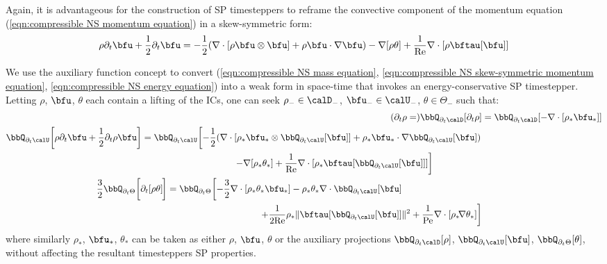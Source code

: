     Again, it is advantageous for the construction of SP timesteppers to reframe the convective component of the momentum equation (\ref{eqn:compressible NS momentum equation}) in a skew-symmetric form:
    \begin{equation}
        \rho\partial_{t}\bfu + \frac{1}{2}\partial_{t}\bfu
        =
        - \frac{1}{2}(\nabla\cdot\left[\rho\bfu\otimes\bfu\right] + \rho\bfu\cdot\nabla\bfu) - \nabla[\rho\theta] + \frac{1}{\rmRe}\nabla\cdot[\rho\bftau[\bfu]]  \label{eqn:compressible NS skew-symmetric momentum equation}
    \end{equation}

    We use the auxiliary function concept to convert (\ref{eqn:compressible NS mass equation}, \ref{eqn:compressible NS skew-symmetric momentum equation}, \ref{eqn:compressible NS energy equation}) into a weak form in space-time that invokes an energy-conservative SP timestepper. Letting $\rho$, $\bfu$, $\theta$ each contain a lifting of the ICs, one can seek $\rho_{-} \in \calD_{-}$, $\bfu_{-} \in \calU_{-}$, $\theta \in \Theta_{-}$ such that:
    \begin{align}
            (\partial_{t}\rho
            =)  \bbQ_{\partial_{t}\calD}[\partial_{t}\rho]
            &=
            \bbQ_{\partial_{t}\calD}[- \nabla\cdot[\rho_{*}\bfu_{*}]]  \label{eqn:compressible NS weak mass equation}  \\
        \begin{split}
            \bbQ_{\partial_{t}\calU}\!\left[\rho\partial_{t}\bfu
            + \frac{1}{2}\partial_{t}\rho\bfu\right]
            &=
            \bbQ_{\partial_{t}\calU}\!\left[- \frac{1}{2}(\nabla\cdot\left[\rho_{*}\bfu_{*}\otimes\bbQ_{\partial_{t}\calU}[\bfu]\right] + \rho_{*}\bfu_{*}\cdot\nabla\bbQ_{\partial_{t}\calU}[\bfu])\right.  \\
            &\qquad\qquad\qquad\qquad\qquad\left.- \nabla[\rho_{*}\theta_{*}]
            + \frac{1}{\rmRe}\nabla\cdot[\rho_{*}\bftau[\bbQ_{\partial_{t}\calU}[\bfu]]]\right]
        \end{split}  \\
        \begin{split}
            \frac{3}{2}\bbQ_{\partial_{t}\Theta}\!\left[\partial_{t}[\rho\theta]\tall\!\right]
            &=
            \bbQ_{\partial_{t}\Theta}\!\left[- \frac{3}{2}\nabla\cdot\left[\rho_{*}\theta_{*}\bfu_{*}\right]
            - \rho_{*}\theta_{*}\nabla\cdot\bbQ_{\partial_{t}\calU}[\bfu]\right.  \\
            &\qquad\qquad\qquad\qquad\qquad\left.+ \frac{1}{2\rmRe}\rho_{*}\|\bftau[\bbQ_{\partial_{t}\calU}[\bfu]]\|^{2}
            + \frac{1}{\rmPe}\nabla\cdot[\rho_{*}\!\nabla\theta_{*}]\right]
      \end{split}  \label{eqn:compressible NS weak energy equation}
    \end{align}
    where similarly $\rho_{*}$, $\bfu_{*}$, $\theta_{*}$ can be taken as either $\rho$, $\bfu$, $\theta$ or the auxiliary projections $\bbQ_{\partial_{t}\calD}[\rho]$, $\bbQ_{\partial_{t}\calU}[\bfu]$, $\bbQ_{\partial_{t}\Theta}[\theta]$, without affecting the resultant timesteppers SP properties.

